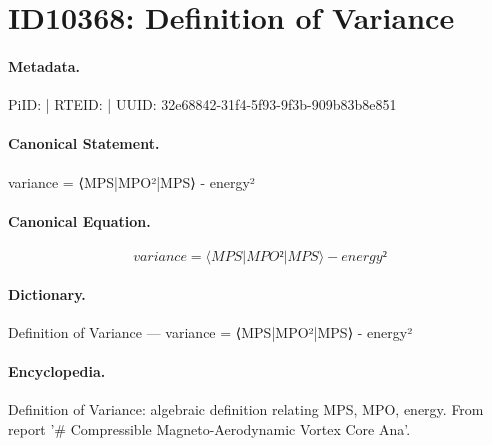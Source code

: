 \section*{ID10368: Definition of Variance}
\paragraph{Metadata.}
PiID:  | RTEID:  | UUID: 32e68842-31f4-5f93-9f3b-909b83b8e851

\paragraph{Canonical Statement.}
variance = ⟨MPS|MPO²|MPS⟩ - energy²

\paragraph{Canonical Equation.}
\[
variance = ⟨MPS|MPO²|MPS⟩ - energy²
\]

\paragraph{Dictionary.}
Definition of Variance — variance = ⟨MPS|MPO²|MPS⟩ - energy²

\paragraph{Encyclopedia.}
Definition of Variance: algebraic definition relating MPS, MPO, energy. From report '\# Compressible Magneto-Aerodynamic Vortex Core Ana'.
